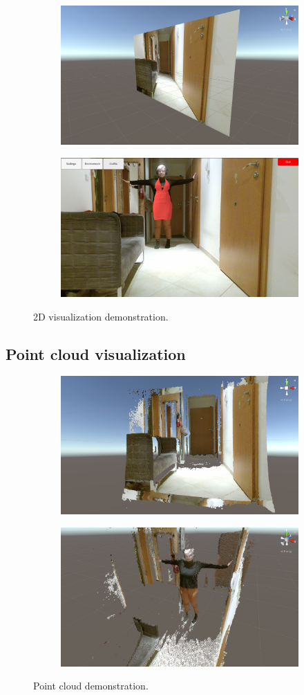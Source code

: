 \documentclass[a4paper]{report}
\begin{document}
 \begin{figure}[H]
\centering
\begin{subfigure}{\textwidth}
  \centering
  \includegraphics[width=.45\textwidth , keepaspectratio]{images/ClothesDemos/Screenshot 2021-05-13 173422.png}
\end{subfigure}%
\begin{subfigure}{\textwidth}
  \centering
  \includegraphics[width=.45\textwidth , keepaspectratio]{images/ClothesDemos/Screenshot 2021-05-14 185933 (1).png}
\end{subfigure}
\caption{2D visualization demonstration.}
\label{fig:example_2d_vis}
\end{figure}






\subsection{Point cloud visualization}
\label{section_pointCLoud}

\begin{figure}[H]
\centering
\begin{subfigure}{\textwidth}
  \centering
  \includegraphics[width=.45\textwidth , keepaspectratio]{images/ClothesDemos/Screenshot 2021-05-13 173650.png}
\end{subfigure}%
\begin{subfigure}{\textwidth}
  \centering
  \includegraphics[width=.45\textwidth , keepaspectratio]{images/ClothesDemos/Screenshot 2021-05-13 174257.png}
\end{subfigure}
\caption{Point cloud demonstration.}
\label{fig:pc_demo_1}
\end{figure}
\end{document}
